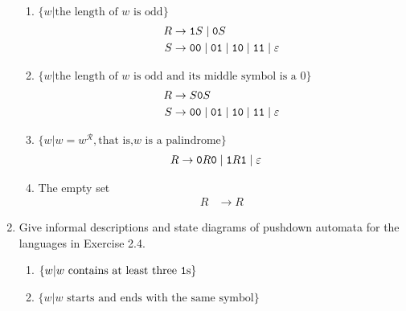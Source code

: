 \begin{enumerate}[font=\bfseries,label=2.\arabic*]
\begin{enumerate}[font=\bfseries,label=\alph*.]
    \item $\{w| \text{the length of $w$ is odd}\}$
    \begin{align*}
        R &\rightarrow {\tt 1}S \mid {\tt 0}S \\
        S &\rightarrow {\tt 00} \mid {\tt 01} \mid {\tt 10} \mid {\tt 11} \mid \varepsilon
    \end{align*}
    
    \item $\{w| \text{the length of $w$ is odd and its middle symbol is a 0}\}$
    \begin{align*}
        R &\rightarrow S{\tt 0}S \\
        S &\rightarrow {\tt 00} \mid {\tt 01} \mid {\tt 10} \mid {\tt 11} \mid \varepsilon
    \end{align*}
    
    
    \item $\{w| w = w^\mathcal R, \text{that is,$w$ is a palindrome}\}$
    \begin{align*}
        R &\rightarrow {\tt 0}R{\tt 0} \mid {\tt 1}R{\tt 1} \mid \varepsilon
    \end{align*}
    
    \item The empty set
    \begin{align*}
        R &\rightarrow R
    \end{align*}

\end{enumerate}


\item Give informal descriptions and state diagrams of pushdown automata for the languages in Exercise 2.4.


\begin{enumerate}[font=\bfseries,label=\alph*.]
    \item $\{w| w\text{ contains at least three \texttt{1}s}\}$
    
    \item $\{w| w\text{ starts and ends with the same symbol}\}$
    

\end{enumerate}
\end{enumerate}
